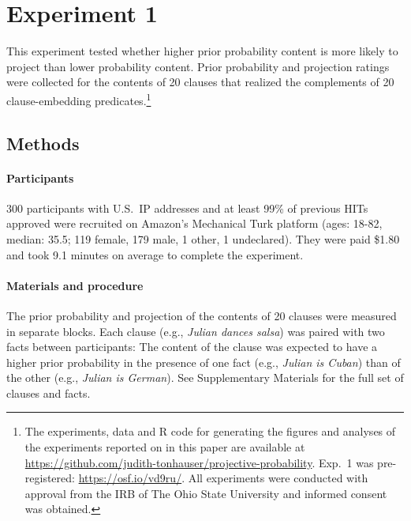 \documentclass[OpenMind]{stjour}
\begin{document}
\section{Experiment 1}\label{s2}

This experiment tested whether higher prior probability content is more likely to project than lower probability content. Prior probability and projection ratings were collected for the contents of 20 clauses that realized the complements of 20 clause-embedding predicates.\footnote{\label{f-github}The experiments, data and R code for generating the figures and analyses of the experiments reported on in this paper are available at \url{https://github.com/judith-tonhauser/projective-probability}. Exp.~1 was pre-registered: \url{https://osf.io/vd9ru/}. All experiments were conducted with approval from the IRB of The Ohio State University and informed consent was obtained.}%

\subsection{Methods} 
 
\paragraph{Participants} 300 participants with U.S.\ IP addresses and at least 99\% of previous HITs approved were recruited on Amazon's Mechanical Turk platform (ages: 18-82, median: 35.5; 119 female, 179 male, 1 other, 1 undeclared). They were paid \$1.80 and took 9.1 minutes on average to complete the experiment.

\paragraph{Materials and procedure} The prior probability and projection of the contents of 20 clauses were measured in separate blocks. Each clause (e.g., \emph{Julian dances salsa}) was paired with two facts between participants: The content of the clause was expected to have a higher prior probability in the presence of one fact (e.g., \emph{Julian is Cuban}) than of the other (e.g., \emph{Julian is German}). See Supplementary Materials for the full set of clauses and facts. 
\end{document}
